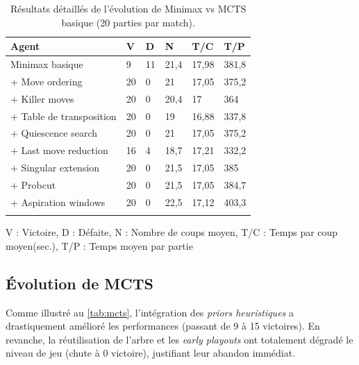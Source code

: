 \documentclass[a4paper,11pt]{article}
\begin{document}
\begin{table}[H]
	\centering
	\caption{Résultats détaillés de l'évolution de Minimax vs MCTS basique (20 parties par match).}
	\label{tab:minimax}
	\begin{tabularx}{\textwidth}{lXXXXX}
		\toprule
		\textbf{Agent}           & \textbf{V} & \textbf{D} & \textbf{N} & \textbf{T/C} & \textbf{T/P} \\
		\midrule
		Minimax basique          & 9          & 11         & 21,4       & 17,98        & 381,8        \\
		+ Move ordering          & 20         & 0          & 21         & 17,05        & 375,2        \\
		+ Killer moves           & 20         & 0          & 20,4       & 17           & 364          \\
		+ Table de transposition & 20         & 0          & 19         & 16,88        & 337,8        \\
		+ Quiescence search      & 20         & 0          & 21         & 17,05        & 375,2        \\
		+ Last move reduction    & 16         & 4          & 18,7       & 17,21        & 332,2        \\
		+ Singular extension     & 20         & 0          & 21,5       & 17,05        & 385          \\
		+ Probcut                & 20         & 0          & 21,5       & 17,05        & 384,7        \\
		+ Aspiration windows     & 20         & 0          & 22,5       & 17,12        & 403,3        \\
		\bottomrule
		\addlinespace
	\end{tabularx}
\end{table}
\small V : Victoire, D : Défaite, N : Nombre de coups moyen, T/C : Temps par coup moyen(sec.), T/P : Temps moyen par partie \\

\subsection{Évolution de MCTS}

Comme illustré au \autoref{tab:mcts}, l'intégration des \textit{priors heuristiques} a drastiquement amélioré les performances (passant de 9 à 15 victoires). En revanche, la réutilisation de l'arbre et les \textit{early playouts} ont totalement dégradé le niveau de jeu (chute à 0 victoire), justifiant leur abandon immédiat.
\end{document}
